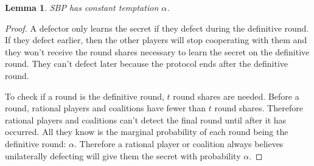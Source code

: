 \documentclass{dalcsthesis}
\newtheorem{lemma}{Lemma}
\begin{document}
\begin{lemma}\label{Lem:SBPConstTempt}SBP has constant temptation $\alpha$.\end{lemma}
\begin{proof}
A defector only learns the secret if they defect during the definitive round. If they defect earlier, then the other players will stop cooperating with them and they won't receive the round shares necessary to learn the secret on the definitive round. They can't defect later because the protocol ends after the definitive round. 

To check if a round is the definitive round, $t$ round shares are needed. Before a round, rational players and coalitions have fewer than $t$ round shares. Therefore rational players and coalitions can't detect the final round until after it has occurred. All they know is the marginal probability of each round being the definitive round: $\alpha$. Therefore a rational player or coalition always believes unilaterally defecting will give them the secret with probability $\alpha$.
\end{proof}
\end{document}
